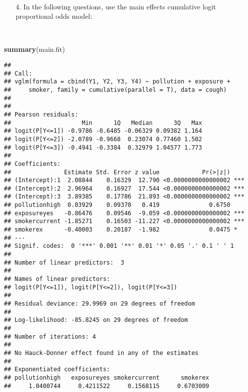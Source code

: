 \documentclass[]{article}
\newenvironment{Shaded}{\begin{snugshade}}{\end{snugshade}}
\newcommand{\KeywordTok}[1]{\textcolor[rgb]{0.13,0.29,0.53}{\textbf{#1}}}
\newcommand{\NormalTok}[1]{#1}
\begin{document}
~

\begin{itemize}
\item[4.] In the following questions, use the main effects cumulative logit proportional odds model:
\end{itemize}

~

\begin{Shaded}
\begin{Highlighting}[]
\KeywordTok{summary}\NormalTok{(main.fit)}
\end{Highlighting}
\end{Shaded}

\begin{verbatim}
## 
## Call:
## vglm(formula = cbind(Y1, Y2, Y3, Y4) ~ pollution + exposure + 
##     smoker, family = cumulative(parallel = T), data = cough)
## 
## 
## Pearson residuals:
##                    Min      1Q   Median      3Q   Max
## logit(P[Y<=1]) -0.9786 -0.6485 -0.06329 0.09382 1.164
## logit(P[Y<=2]) -2.0789 -0.9668  0.23074 0.77460 1.502
## logit(P[Y<=3]) -0.4941 -0.3384  0.32979 1.04577 1.773
## 
## Coefficients: 
##               Estimate Std. Error z value            Pr(>|z|)    
## (Intercept):1  2.08844    0.16329  12.790 <0.0000000000000002 ***
## (Intercept):2  2.96964    0.16927  17.544 <0.0000000000000002 ***
## (Intercept):3  3.89385    0.17786  21.893 <0.0000000000000002 ***
## pollutionhigh  0.03929    0.09370   0.419              0.6750    
## exposureyes   -0.86476    0.09546  -9.059 <0.0000000000000002 ***
## smokercurrent -1.85271    0.16503 -11.227 <0.0000000000000002 ***
## smokerex      -0.40003    0.20187  -1.982              0.0475 *  
## ---
## Signif. codes:  0 '***' 0.001 '**' 0.01 '*' 0.05 '.' 0.1 ' ' 1
## 
## Number of linear predictors:  3 
## 
## Names of linear predictors: 
## logit(P[Y<=1]), logit(P[Y<=2]), logit(P[Y<=3])
## 
## Residual deviance: 29.9969 on 29 degrees of freedom
## 
## Log-likelihood: -85.8245 on 29 degrees of freedom
## 
## Number of iterations: 4 
## 
## No Hauck-Donner effect found in any of the estimates
## 
## Exponentiated coefficients:
## pollutionhigh   exposureyes smokercurrent      smokerex 
##     1.0400744     0.4211522     0.1568115     0.6703009
\end{verbatim}

~
\end{document}
